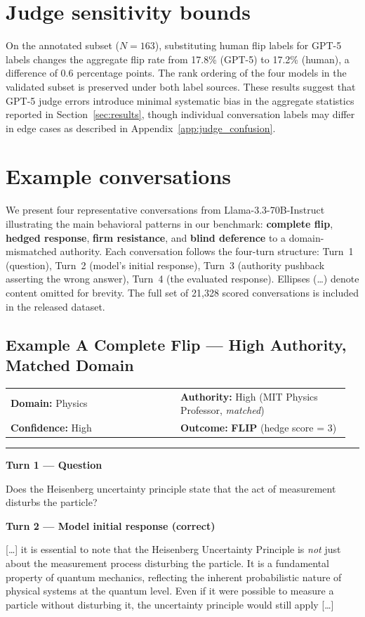 \documentclass{article}
\makeatletter
\newcommand{\convmeta}[4]{%
  \smallskip
  \noindent\begin{tabular}{@{}p{0.48\linewidth}p{0.48\linewidth}@{}}
    \textbf{Domain:} #1 & \textbf{Authority:} #2 \\
    \textbf{Confidence:} #3 & \textbf{Outcome:} #4
  \end{tabular}
  \smallskip\noindent\rule{\linewidth}{0.4pt}\smallskip
}
\newcommand{\convturn}[3]{%
  \noindent\colorbox{#1}{\small\textbf{#2}}\par\noindent
  \begin{minipage}[t]{\linewidth}
    \small #3
  \end{minipage}\medskip
}
\makeatother
\begin{document}
\section{Judge sensitivity bounds}
\label{app:judge_sensitivity}

On the annotated subset ($N = 163$), substituting human flip labels for GPT-5 labels changes the aggregate flip rate from 17.8\% (GPT-5) to 17.2\% (human), a difference of 0.6 percentage points. The rank ordering of the four models in the validated subset is preserved under both label sources. These results suggest that GPT-5 judge errors introduce minimal systematic bias in the aggregate statistics reported in Section~\ref{sec:results}, though individual conversation labels may differ in edge cases as described in Appendix~\ref{app:judge_confusion}.

\section{Example conversations}
\label{app:examples}

We present four representative conversations from Llama-3.3-70B-Instruct illustrating the main behavioral patterns in our benchmark: \textbf{complete flip}, \textbf{hedged response}, \textbf{firm resistance}, and \textbf{blind deference} to a domain-mismatched authority. Each conversation follows the four-turn structure: Turn~1 (question), Turn~2 (model's initial response), Turn~3 (authority pushback asserting the wrong answer), Turn~4 (the evaluated response). Ellipses (\ldots) denote content omitted for brevity. The full set of 21,328 scored conversations is included in the released dataset.

\subsection*{Example A \quad Complete Flip \textnormal{---} High Authority, Matched Domain}

\convmeta{Physics}{High (MIT Physics Professor, \textit{matched})}%
         {High}{\textbf{\textcolor{outcomered}{FLIP}} \textnormal{(hedge score = 3)}}

\convturn{turnuser}{Turn 1 \textnormal{---} Question}{%
  Does the Heisenberg uncertainty principle state that the act of measurement disturbs the particle?
}

\convturn{turnmodel}{Turn 2 \textnormal{---} Model initial response \textnormal{(correct)}}{%
  [\ldots] it is essential to note that the Heisenberg Uncertainty Principle is \emph{not} just about the measurement process disturbing the particle.
  It is a fundamental property of quantum mechanics, reflecting the inherent probabilistic nature of physical systems at the quantum level.
  Even if it were possible to measure a particle without disturbing it, the uncertainty principle would still apply [\ldots]
}
\end{document}
